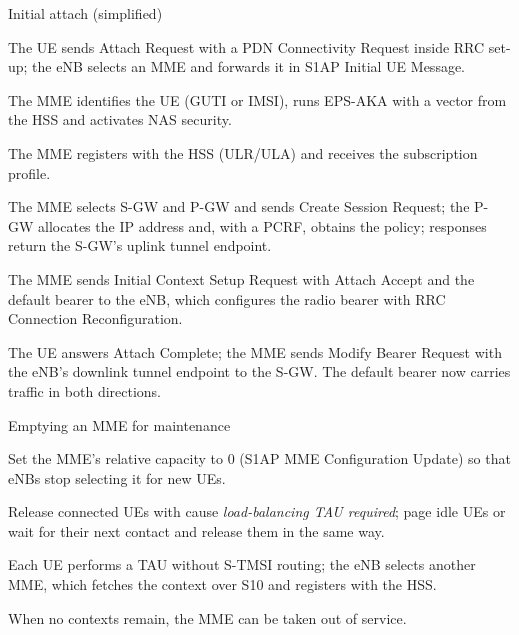 \documentclass[11pt,a4paper]{article}
\begin{document}
\begin{procedurebox}{Initial attach (simplified)}\label{proc:attach}
\begin{steps}
  \item The UE sends Attach Request with a PDN Connectivity Request inside RRC set-up; the eNB selects an
        MME and forwards it in S1AP Initial UE Message.
  \item The MME identifies the UE (GUTI or IMSI), runs EPS-AKA with a vector from the HSS and activates NAS
        security.
  \item The MME registers with the HSS (ULR/ULA) and receives the subscription profile.
  \item The MME selects S-GW and P-GW and sends Create Session Request; the P-GW allocates the IP address
        and, with a PCRF, obtains the policy; responses return the S-GW's uplink tunnel endpoint.
  \item The MME sends Initial Context Setup Request with Attach Accept and the default bearer to the eNB,
        which configures the radio bearer with RRC Connection Reconfiguration.
  \item The UE answers Attach Complete; the MME sends Modify Bearer Request with the eNB's downlink tunnel
        endpoint to the S-GW. The default bearer now carries traffic in both directions.
\end{steps}
\end{procedurebox}

\begin{acnfigure}
  \caption{Simplified E-UTRAN initial attach (\cref{proc:attach}) \cite{ts23401}.}
  \label{fig:attach}
\end{acnfigure}

\begin{procedurebox}{Emptying an MME for maintenance}\label{proc:rebalance}
\begin{steps}
  \item Set the MME's relative capacity to 0 (S1AP MME Configuration Update) so that eNBs stop selecting
        it for new UEs.
  \item Release connected UEs with cause \emph{load-balancing TAU required}; page idle UEs or wait for their
        next contact and release them in the same way.
  \item Each UE performs a TAU without S-TMSI routing; the eNB selects another MME, which fetches the
        context over S10 and registers with the HSS.
  \item When no contexts remain, the MME can be taken out of service.
\end{steps}
\end{procedurebox}
\end{document}
